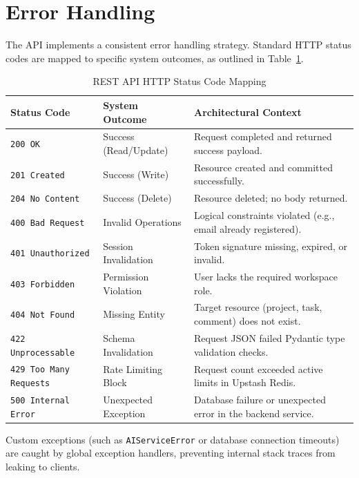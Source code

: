 \section{Error Handling}
The API implements a consistent error handling strategy. Standard HTTP status codes are mapped to specific system outcomes, as outlined in Table~\ref{tab:http_status_codes}.

\begin{table}[h!]
\centering
\small
\renewcommand{\arraystretch}{1.4}
\begin{tabularx}{\textwidth}{l l X}
    \toprule[1.5pt]
    \rowcolor{primary!5}
    \textbf{\color{primary}Status Code} & \textbf{\color{primary}System Outcome} & \textbf{\color{primary}Architectural Context} \\
    \midrule
    \texttt{200 OK} & Success (Read/Update) & Request completed and returned success payload. \\
    \texttt{201 Created} & Success (Write) & Resource created and committed successfully. \\
    \texttt{204 No Content} & Success (Delete) & Resource deleted; no body returned. \\
    \texttt{400 Bad Request} & Invalid Operations & Logical constraints violated (e.g., email already registered). \\
    \texttt{401 Unauthorized} & Session Invalidation & Token signature missing, expired, or invalid. \\
    \texttt{403 Forbidden} & Permission Violation & User lacks the required workspace role. \\
    \texttt{404 Not Found} & Missing Entity & Target resource (project, task, comment) does not exist. \\
    \texttt{422 Unprocessable} & Schema Invalidation & Request JSON failed Pydantic type validation checks. \\
    \texttt{429 Too Many Requests} & Rate Limiting Block & Request count exceeded active limits in Upstash Redis. \\
    \texttt{500 Internal Error} & Unexpected Exception & Database failure or unexpected error in the backend service. \\
    \bottomrule[1.5pt]
\end{tabularx}
\caption{REST API HTTP Status Code Mapping}
\label{tab:http_status_codes}
\end{table}

Custom exceptions (such as \texttt{AIServiceError} or database connection timeouts) are caught by global exception handlers, preventing internal stack traces from leaking to clients.

